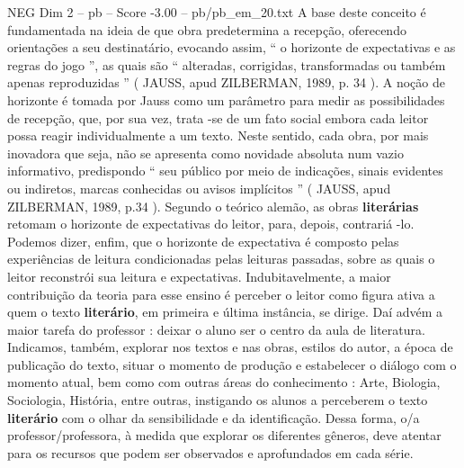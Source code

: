 \begin{textsample}{NEG Dim 2 – pb – Score -3.00 – pb/pb\_em\_20.txt}
A base deste conceito é fundamentada na ideia de que obra predetermina a recepção, oferecendo orientações a seu destinatário, evocando assim, “ o horizonte de expectativas e as regras do jogo ”, as quais são “ alteradas, corrigidas, transformadas ou também apenas reproduzidas ” ( JAUSS, apud ZILBERMAN, 1989, p. 34 ).
A noção de horizonte é tomada por Jauss como um parâmetro para medir as possibilidades de recepção, que, por sua vez, trata -se de um fato social embora cada leitor possa reagir individualmente a um texto.
Neste sentido, cada obra, por mais inovadora que seja, não se apresenta como novidade absoluta num vazio informativo, predispondo “ seu público por meio de indicações, sinais evidentes ou indiretos, marcas conhecidas ou avisos implícitos ” ( JAUSS, apud ZILBERMAN, 1989, p.34 ).
Segundo o teórico alemão, as obras \textbf{literárias} retomam o horizonte de expectativas do leitor, para, depois, contrariá -lo.
Podemos dizer, enfim, que o horizonte de expectativa é composto pelas experiências de leitura condicionadas pelas leituras passadas, sobre as quais o leitor reconstrói sua leitura e expectativas.
Indubitavelmente, a maior contribuição da teoria para esse ensino é perceber o leitor como figura ativa a quem o texto \textbf{literário}, em primeira e última instância, se dirige.
Daí advém a maior tarefa do professor : deixar o aluno ser o centro da aula de literatura.
Indicamos, também, explorar nos textos e nas obras, estilos do autor, a época de publicação do texto, situar o momento de produção e estabelecer o diálogo com o momento atual, bem como com outras áreas do conhecimento : Arte, Biologia, Sociologia, História, entre outras, instigando os alunos a perceberem o texto \textbf{literário} com o olhar da sensibilidade e da identificação.
Dessa forma, o/a professor/professora, à medida que explorar os diferentes gêneros, deve atentar para os recursos que podem ser observados e aprofundados em cada série.

\end{textsample}
